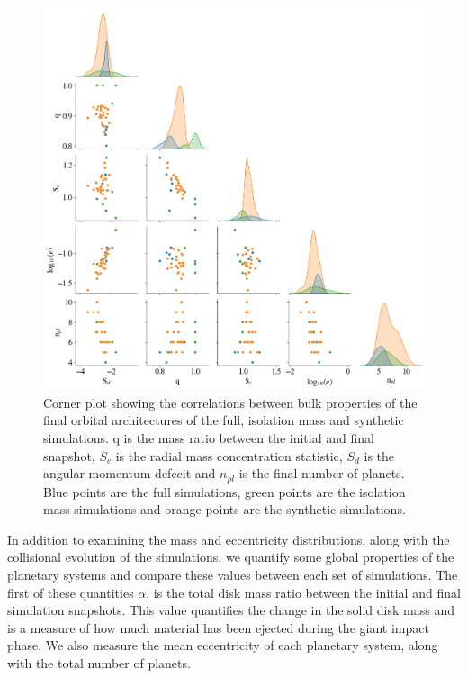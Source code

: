 \begin{figure}
\begin{center}
    \includegraphics[width=\textwidth]{figures/stip/corner_full_syn_iso.png}
    \caption{Corner plot showing the correlations between bulk properties of the final orbital architectures of the full, isolation mass and synthetic simulations. q is the mass ratio between the initial and final snapshot, $S_{c}$ is the radial mass concentration statistic, $S_{d}$ is the angular momentum defecit and $n_{pl}$ is the final number of planets. Blue points are the full simulations, green points are the isolation mass simulations and orange points are the synthetic simulations.\label{fig:corner_full_syn_iso}}
\end{center}
\end{figure}

In addition to examining the mass and eccentricity distributions, along with the collisional evolution of the simulations, we quantify some global properties of the planetary systems and compare these values between each set of simulations. The first of these quantities $\alpha$, is the total disk mass ratio between the initial and final simulation snapshots. This value quantifies the change in the solid disk mass and is a measure of how much material has been ejected during the giant impact phase. We also measure the mean eccentricity of each planetary system, along with the total number of planets.

